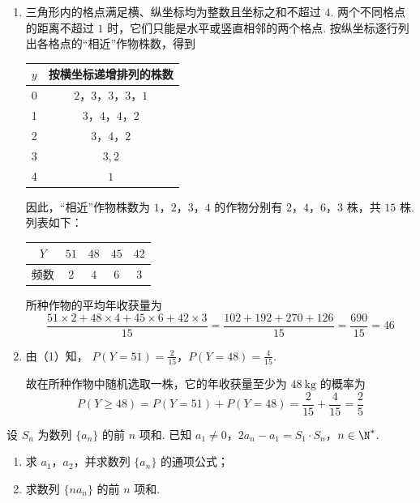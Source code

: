 \begin{solution}
\begin{enumerate}
\item 三角形内的格点满足横、纵坐标均为整数且坐标之和不超过 \(4\). 两个不同格点的距离不超过 \(1\) 时，它们只能是水平或竖直相邻的两个格点. 按纵坐标逐行列出各格点的“相近”作物株数，得到
\begin{center}
\begin{tabular}{c|c}
\(y\) & 按横坐标递增排列的株数 \\
\hline
0 & \(2\)，\(3\)，\(3\)，\(3\)，\(1\) \\
1 & \(3\)，\(4\)，\(4\)，\(2\) \\
2 & \(3\)，\(4\)，\(2\) \\
3 & \(3,2\) \\
4 & \(1\)
\end{tabular}
\end{center}
因此，“相近”作物株数为 \(1\)，\(2\)，\(3\)，\(4\) 的作物分别有 \(2\)，\(4\)，\(6\)，\(3\) 株，共 \(15\) 株. 列表如下：

\begin{center}
\begin{tabular}{c|cccc}
\(Y\) & \(51\) & \(48\) & \(45\) & \(42\) \\
\hline
频数 & \(2\) & \(4\) & \(6\) & \(3\)
\end{tabular}
\end{center}

所种作物的平均年收获量为
\[
\frac{51\times2+48\times4+45\times6+42\times3}{15}=\frac{102+192+270+126}{15}=\frac{690}{15}=46
\]

\item 由（1）知，
\(P(Y=51)=\frac{2}{15}\)，\(P(Y=48)=\frac{4}{15}\).

故在所种作物中随机选取一株，它的年收获量至少为 \(48\mathrm{~kg}\) 的概率为
\[
P(Y\geqslant48)=P(Y=51)+P(Y=48)=\frac{2}{15}+\frac{4}{15}=\frac{2}{5}
\]
\end{enumerate}
\end{solution}

\begin{problem}
设 \(S_{n}\) 为数列 \(\{a_{n}\}\) 的前 \(n\) 项和. 已知 \(a_1 \neq 0\)，\(2a_{n} - a_1 = S_1 \cdot S_n\)，\(n \in \N^*\).
\begin{enumerate}
\item 求 \(a_{1}\)，\(a_{2}\)，并求数列 \( \{a_{n}\} \) 的通项公式；
\item 求数列 \( \{na_{n}\} \) 的前 \(n\) 项和.
\end{enumerate}
\end{problem}

